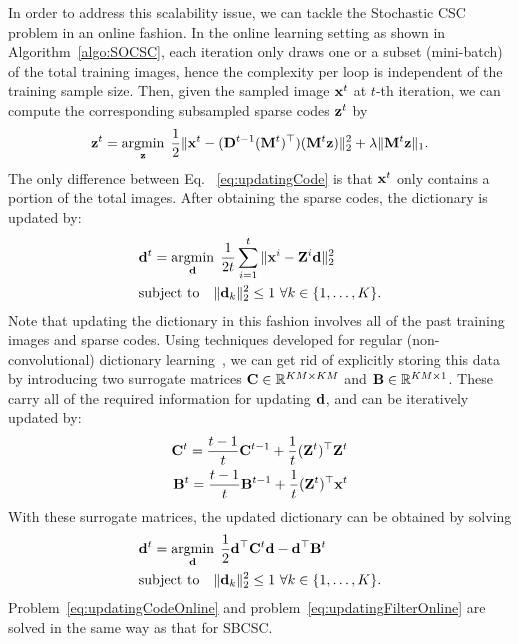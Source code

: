 In order to address this scalability issue, we can tackle the
Stochastic CSC problem in an online fashion. In the online learning
setting as shown in Algorithm~\ref{algo:SOCSC}, each iteration only
draws one or a subset (mini-batch) of the total training images, hence
the complexity per loop is independent of the training sample
size. Then, given the sampled image $\signal^t$ at $t$-th iteration,
we can compute the corresponding subsampled sparse codes $\code^t$ by
\begin{equation} \label{eq:updatingCodeOnline}
    \code^t = \minimize{\code} \frac{1}{2}\|\signal^t - (\Filter^{t-1} (\mask^t)^\top)(\mask^t \code) \|_2^2 + \lambda \|\mask^t \code\|_1.
\end{equation}
The only difference between Eq. ~\ref{eq:updatingCode} is that $\signal^t$ only contains a portion of the total images. After obtaining
the sparse codes, the dictionary is updated by:
\begin{equation}
\begin{split}
    &\filter^t = \minimize{\filter} \frac{1}{2t}\sum_{i=1}^{t} \|\signal^i - \Code^i \filter \|_2^2 \\
    &\text{subject to} \quad \|\filter_k\|^2_2 \leq 1 ~ \forall k \in \{1,\dots,K\}.
\end{split}
\end{equation}
Note that updating the dictionary in this fashion involves all of the
past training images and sparse codes. Using techniques developed for
regular (non-convolutional) dictionary
learning~\cite{mairal2009online,mairal2010online}, we can get rid of
explicitly storing this data by introducing two surrogate matrices
$\surC \in \mathbb{R}^{KM \times KM}$ and $\surB \in \mathbb{R}^{KM
  \times 1}$. These carry all of the required information for updating
$\filter$, and can be iteratively updated by:
\begin{equation} \label{eq:updateSur}
\begin{split}
    \surC^t  = \frac{t-1}{t} \surC^{t-1} + \frac{1}{t}(\Code^t)^\top \Code^t \\
    \surB^t  = \frac{t-1}{t} \surB^{t-1} + \frac{1}{t}(\Code^t)^\top \signal^t
\end{split}
\end{equation}
With these surrogate matrices, the updated dictionary can be obtained
by solving
\begin{equation} \label{eq:updatingFilterOnline}
\begin{split}
    & \filter^t = \minimize{\filter} \frac{1}{2} \filter^\top \surC^t\filter - \filter^\top \surB^t \\& \text{subject to} \quad \|\filter_k\|_2^2 \leq 1 ~ \forall k \in \{1,\dots,K\}.
\end{split}
\end{equation}
Problem~\eqref{eq:updatingCodeOnline} and
problem~\eqref{eq:updatingFilterOnline} are solved in the same way as
that for SBCSC.

